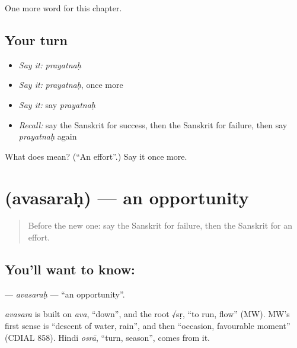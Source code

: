 \begin{grammarlens}[title={What you've built}]
One more word for this chapter.
\end{grammarlens}

\subsection*{Your turn}
\begin{itemize}
\raggedright
  \item \emph{Say it:} \emph{prayatnaḥ}
  \item \emph{Say it:} \emph{prayatnaḥ}, once more
  \item \emph{Say it:} say \emph{prayatnaḥ}
  \item \emph{Recall:} say the Sanskrit for success, then the Sanskrit for failure, then say \emph{prayatnaḥ} again
\end{itemize}

\begin{tcolorbox}[breakable,colback=teal!4,colframe=teal!35!black,title={Before you move on}]
What does  mean? (\textquotedblleft{}An effort\textquotedblright{}.) Say it once more.
\end{tcolorbox}
\section[\texorpdfstring{\sk{अवसरः} (avasaraḥ)}{अवसरः (avasaraḥ)}]{ (avasaraḥ) — an opportunity}

\label{lesson:SA-C230-avasarah}



\begin{quote}
Before the new one: say the Sanskrit for failure, then the Sanskrit for an effort.
\end{quote}

\subsection*{You'll want to know: }
\textbf{} — \emph{avasaraḥ} — \textquotedblleft{}an opportunity\textquotedblright{}.

\begin{cousinweb}
\emph{avasara} is built on \emph{ava}, \textquotedblleft{}down\textquotedblright{}, and the root √sṛ, \textquotedblleft{}to run, flow\textquotedblright{} (MW). MW's first sense is \textquotedblleft{}descent of water, rain\textquotedblright{}, and then \textquotedblleft{}occasion, favourable moment\textquotedblright{} (CDIAL 858). Hindi \emph{osrā}, \textquotedblleft{}turn, season\textquotedblright{}, comes from it.
\end{cousinweb}


